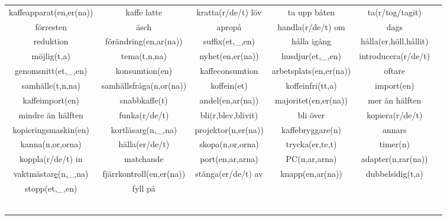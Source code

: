 
\begin{center}
    \begin{adjustwidth}{-2.4cm}{}
        \begin{tabular}{|c c c c c c|}
            \hline
            kaffeapparat(en,er(na)) & kaffe latte & kratta(r/de/t) löv & ta upp båten & ta(r/tog/tagit) &  \\
            förresten & äsch & apropå & handla(r/de/t) om & dags &  \\
            reduktion & förändring(en,ar(na)) & suffix(et,\_,en) & hålla igång & hålla(er,höll,hållit) &  \\
            möjlig(t,a) & tema(t,n,na) & nyhet(en,er(na)) & husdjur(et,\_,en) & introducera(r/de/t) &  \\
            genomsnitt(et,\_,en) & konsumtion(en) & kaffeconsumtion & arbetsplats(en,er(na)) & oftare &  \\
            samhälle(t,n,na) & samhällsfråga(n,or(na)) & koffein(et) & koffeinfri(tt,a) & import(en) &  \\
            kaffeimport(en) & snabbkaffe(t) & andel(en,ar(na)) & majoritet(en,er(na)) & mer än hälften &  \\
            mindre än hälften & funka(r/de/t) & bli(r,blev,blivit) & bli över & kopiera(r/de/t) &  \\
            kopieringsmaskin(en) & kortläsar\underline{e}(n,\_,na) & projektor(n,er(na)) & kaffebryggare(n) & annars &  \\
            kanna(n,or,orna) & hälla(er/de/t) & skopa(n,or,orna) & trycka(er,te,t) & timer(n) &  \\
            koppla(r/de/t) in & matchande & port(en,ar,arna) & PC(n,ar,arna) & adapter(n,rar(na)) &  \\
            vaktmästar\underline{e}(n,\_,na) & fjärrkontroll(en,er(na)) & stänga(er/de/t) av & knapp(en,ar(na)) & dubbelsidig(t,a) &  \\
            stopp(et,\_,en) & fyll på &  &  &  &  \\
             &  &  &  &  &  \\
             &  &  &  &  &  \\
             &  &  &  &  &  \\
             &  &  &  &  &  \\
             &  &  &  &  &  \\
             &  &  &  &  &  \\

\end{tabular}
\end{adjustwidth}
\end{center}
